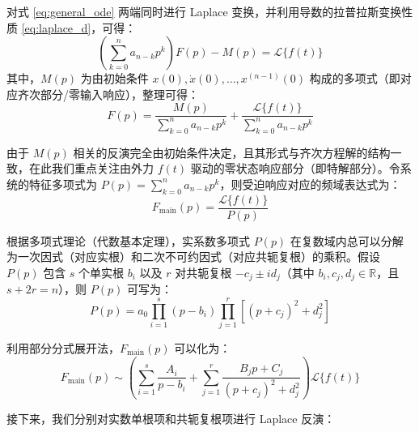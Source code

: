 \documentclass[11pt,a4paper]{ctexart}
\begin{document}
对式 \eqref{eq:general_ode} 两端同时进行 Laplace 变换，并利用导数的拉普拉斯变换性质 \eqref{eq:laplace_d}，可得：
\begin{equation}
    \left( \sum_{k=0}^{n} a_{n-k} p^k \right) F(p) - M(p) = \mathcal{L}\{f(t)\}
\end{equation}
其中，\(M(p)\) 为由初始条件 \(x(0), \dot{x}(0), \dots, x^{(n-1)}(0)\) 构成的多项式（即对应齐次部分/零输入响应），整理可得：
\begin{equation}
    F(p) = \frac{M(p)}{\sum_{k=0}^{n} a_{n-k} p^k} + \frac{\mathcal{L}\{f(t)\}}{\sum_{k=0}^{n} a_{n-k} p^k}
\end{equation}

由于 \(M(p)\) 相关的反演完全由初始条件决定，且其形式与齐次方程解的结构一致，在此我们重点关注由外力 \(f(t)\) 驱动的零状态响应部分（即特解部分）。令系统的特征多项式为 \(P(p) = \sum_{k=0}^{n} a_{n-k} p^k\)，则受迫响应对应的频域表达式为：
\begin{equation}
    F_{\text{main}}(p) = \frac{\mathcal{L}\{f(t)\}}{P(p)}
\end{equation}

根据多项式理论（代数基本定理），实系数多项式 \(P(p)\) 在复数域内总可以分解为一次因式（对应实根）和二次不可约因式（对应共轭复根）的乘积。假设 \(P(p)\) 包含 \(s\) 个单实根 \(b_i\) 以及 \(r\) 对共轭复根 \(-c_j \pm i d_j\)（其中 \(b_i, c_j, d_j \in \mathbb{R}\)，且 \(s + 2r = n\)），则 \(P(p)\) 可写为：
\begin{equation}
    P(p) = a_0 \prod_{i=1}^{s} (p - b_i) \prod_{j=1}^{r} \left[ (p + c_j)^2 + d_j^2 \right]
\end{equation}

利用部分分式展开法，\(F_{\text{main}}(p)\) 可以化为：
\begin{equation}
    F_{\text{main}}(p) \sim \left( \sum_{i=1}^{s} \frac{A_i}{p - b_i} + \sum_{j=1}^{r} \frac{B_j p + C_j}{(p + c_j)^2 + d_j^2} \right) \mathcal{L}\{f(t)\}
\end{equation}

接下来，我们分别对实数单根项和共轭复根项进行 Laplace 反演：
\end{document}

